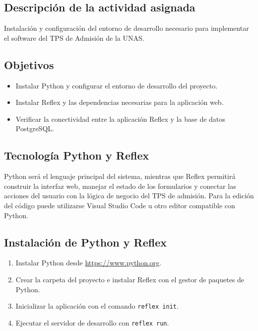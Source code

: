 \documentclass[12pt, a4paper]{report}
\begin{document}
\subsection{Descripción de la actividad asignada}

Instalación y configuración del entorno de desarrollo necesario para implementar el software del TPS de Admisión de la UNAS.

\subsection{Objetivos}

\begin{itemize}[noitemsep]
  \item Instalar Python y configurar el entorno de desarrollo del proyecto.
  \item Instalar Reflex y las dependencias necesarias para la aplicación web.
  \item Verificar la conectividad entre la aplicación Reflex y la base de datos PostgreSQL.
\end{itemize}

\subsection{Tecnología Python y Reflex}

Python será el lenguaje principal del sistema, mientras que Reflex permitirá construir la interfaz web, manejar el estado de los formularios y conectar las acciones del usuario con la lógica de negocio del TPS de admisión. Para la edición del código puede utilizarse Visual Studio Code u otro editor compatible con Python.

\subsection{Instalación de Python y Reflex}

\begin{enumerate}[noitemsep]
  \item Instalar Python desde \url{https://www.python.org}.
  \item Crear la carpeta del proyecto e instalar Reflex con el gestor de paquetes de Python.
  \item Inicializar la aplicación con el comando \texttt{reflex init}.
  \item Ejecutar el servidor de desarrollo con \texttt{reflex run}.
\end{enumerate}
\end{document}
